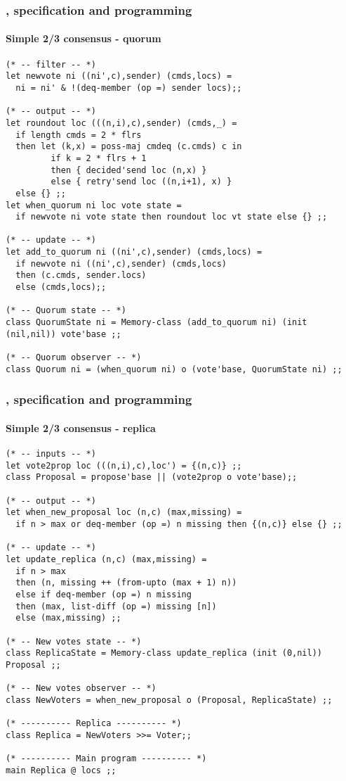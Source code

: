 \documentclass[12pt,red]{beamer}
\begin{document}
\begin{frame}[fragile]
  \frametitle{\eml, specification and programming}

  \framesubtitle{Simple 2/3 consensus - quorum}

\begin{lstlisting}[basicstyle=\tiny]
(* -- filter -- *)
let newvote ni ((ni',c),sender) (cmds,locs) =
  ni = ni' & !(deq-member (op =) sender locs);;

(* -- output -- *)
let roundout loc (((n,i),c),sender) (cmds,_) =
  if length cmds = 2 * flrs
  then let (k,x) = poss-maj cmdeq (c.cmds) c in
         if k = 2 * flrs + 1
         then { decided'send loc (n,x) }
         else { retry'send loc ((n,i+1), x) }
  else {} ;;
let when_quorum ni loc vote state =
  if newvote ni vote state then roundout loc vt state else {} ;;

(* -- update -- *)
let add_to_quorum ni ((ni',c),sender) (cmds,locs) =
  if newvote ni ((ni',c),sender) (cmds,locs)
  then (c.cmds, sender.locs)
  else (cmds,locs);;

(* -- Quorum state -- *)
class QuorumState ni = Memory-class (add_to_quorum ni) (init (nil,nil)) vote'base ;;

(* -- Quorum observer -- *)
class Quorum ni = (when_quorum ni) o (vote'base, QuorumState ni) ;;
\end{lstlisting}
\end{frame}



\begin{frame}[fragile]
  \frametitle{\eml, specification and programming}

  \framesubtitle{Simple 2/3 consensus - replica}

\begin{lstlisting}[basicstyle=\tiny]
(* -- inputs -- *)
let vote2prop loc (((n,i),c),loc') = {(n,c)} ;;
class Proposal = propose'base || (vote2prop o vote'base);;

(* -- output -- *)
let when_new_proposal loc (n,c) (max,missing) =
  if n > max or deq-member (op =) n missing then {(n,c)} else {} ;;

(* -- update -- *)
let update_replica (n,c) (max,missing) =
  if n > max
  then (n, missing ++ (from-upto (max + 1) n))
  else if deq-member (op =) n missing
  then (max, list-diff (op =) missing [n])
  else (max,missing) ;;

(* -- New votes state -- *)
class ReplicaState = Memory-class update_replica (init (0,nil)) Proposal ;;

(* -- New votes observer -- *)
class NewVoters = when_new_proposal o (Proposal, ReplicaState) ;;

(* ---------- Replica ---------- *)
class Replica = NewVoters >>= Voter;;

(* ---------- Main program ---------- *)
main Replica @ locs ;;
\end{lstlisting}
\end{frame}
\end{document}

